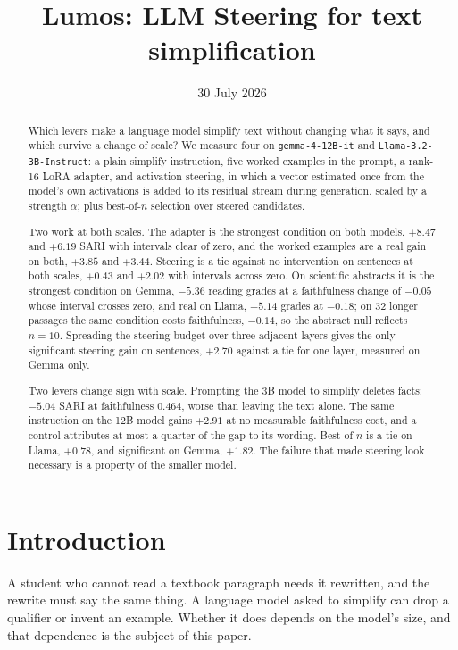 \documentclass[aps,prb,reprint,nofootinbib,a4paper]{revtex4-2}
\newcommand{\code}[1]{\texttt{\small #1}}
\begin{document}
\title{Lumos: LLM Steering for text simplification}
\author{}
\noaffiliation
\date{30 July 2026}

\begin{abstract}
Which levers make a language model simplify text without changing what it
says, and which survive a change of scale? We measure four on
\code{gemma-4-12B-it} and \code{Llama-3.2-3B-Instruct}: a plain simplify
instruction, five worked examples in the prompt, a rank-16 LoRA adapter, and
activation steering, in which a vector estimated once from the model's own
activations is added to its residual stream during generation, scaled by a
strength $\alpha$; plus best-of-$n$ selection over steered candidates.

Two work at both scales. The adapter is the strongest condition on both
models, $+8.47$ and $+6.19$ SARI with intervals clear of zero, and the worked
examples are a real gain on both, $+3.85$ and $+3.44$. Steering is a tie
against no intervention on sentences at both scales, $+0.43$ and $+2.02$ with
intervals across zero. On scientific abstracts it is the strongest condition
on Gemma, $-5.36$ reading grades at a faithfulness change of $-0.05$ whose
interval crosses zero, and real on Llama, $-5.14$ grades at $-0.18$; on 32
longer passages the same condition costs faithfulness, $-0.14$, so the
abstract null reflects $n=10$. Spreading the steering budget over three
adjacent layers gives the only significant steering gain on sentences, $+2.70$
against a tie for one layer, measured on Gemma only.

Two levers change sign with scale. Prompting the 3B model to simplify deletes
facts: $-5.04$ SARI at faithfulness $0.464$, worse than leaving the text
alone. The same instruction on the 12B model gains $+2.91$ at no measurable
faithfulness cost, and a control attributes at most a quarter of the gap to
its wording. Best-of-$n$ is a tie on Llama, $+0.78$, and significant on Gemma,
$+1.82$. The failure that made steering look necessary is a property of the
smaller model.
\end{abstract}

\maketitle

\section{Introduction}

A student who cannot read a textbook paragraph needs it rewritten, and the
rewrite must say the same thing. A language model asked to simplify can drop a
qualifier or invent an example. Whether it does depends on the model's size,
and that dependence is the subject of this paper.
\end{document}
